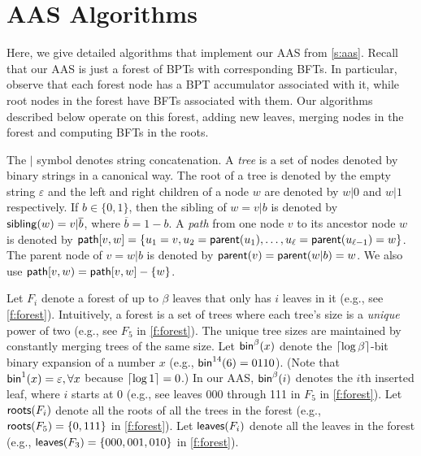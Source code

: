 \section{AAS Algorithms}
\label{s:aas:algorithms}
Here, we give detailed algorithms that implement our AAS from \cref{s:aas}.
Recall that our AAS is just a forest of BPTs with corresponding BFTs.
In particular, observe that each forest node has a BPT accumulator associated with it, while root nodes in the forest have BFTs associated with them.
Our algorithms described below operate on this forest, adding new leaves, merging nodes in the forest and computing BFTs in the roots.

\label{s:prelim:notation:trees}
The $|$ symbol denotes string concatenation.
A \textit{tree} is a set of nodes denoted by binary strings in a canonical way.
The root of a tree is denoted by the empty string $\varepsilon$ and the left and right children of a node $w$ are denoted by $w|0$ and $w|1$ respectively.
If $b\in\{0,1\}$, then the sibling of $w = v|b$ is denoted by $\mathsf{sibling}(w) = v|\overline{b}$, where $\overline{b} = 1-b$.
A \emph{path} from one node $v$ to its ancestor node $w$ is denoted by $\mathsf{path}[v,w] = \{u_1 = v, u_2 = \mathsf{parent}(u_1), \dots, u_\ell = \mathsf{parent}(u_{\ell-1}) = w\}$.
The parent node of $v = w|b$ is denoted by $\mathsf{parent}(v) = \mathsf{parent}(w|b) = w$.
We also use $\mathsf{path}[v,w) = \mathsf{path}[v,w]-\{w\}$.

\label{s:prelim:notation:forests}
Let $F_i$ denote a forest of up to $\beta$ leaves that only has $i$ leaves in it (e.g., see \cref{f:forest}).
Intuitively, a forest is a set of trees where each tree's size is a \textit{unique} power of two (e.g., see $F_5$ in \cref{f:forest}).
The unique tree sizes are maintained by constantly merging trees of the same size.
Let $\mathsf{bin}^\beta(x)$ denote the $\lceil\log{\beta}\rceil$-bit binary expansion of a number $x$ (e.g., $\mathsf{bin}^{14}(6)=0110$).
(Note that $\mathsf{bin}^1(x) = \varepsilon,\forall x$ because $\lceil\log{1}\rceil=0$.)
In our AAS, $\mathsf{bin}^\beta(i)$ denotes the $i$th inserted leaf, where $i$ starts at 0 (e.g., see leaves 000 through 111 in $F_5$ in \cref{f:forest}).
Let $\mathsf{roots}(F_i)$ denote all the roots of all the trees in the forest (e.g., $\mathsf{roots}(F_5) = \{0, 111\}$ in \cref{f:forest}).
Let $\mathsf{leaves}(F_i)$ denote all the leaves in the forest (e.g., $\mathsf{leaves}(F_3) = \{000, 001, 010\}$ in \cref{f:forest}).

